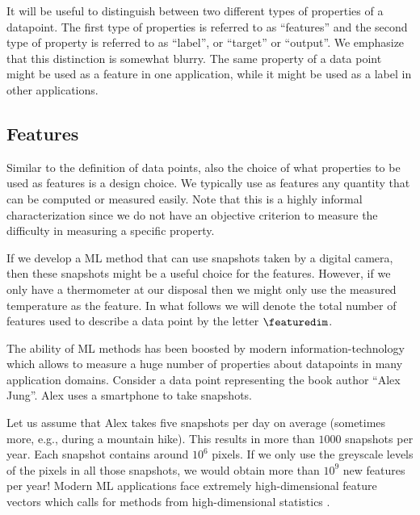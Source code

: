 \documentclass[12pt]{report}
\newcommand{\featurelen}{\featuredim}
\begin{document}
It will be useful to distinguish between two different types of properties of a 
datapoint. The first type of properties is referred to as ``features''  and the second 
type of property is referred to as ``label'', or ``target'' or ``output''. 
We emphasize that this distinction is somewhat blurry. The same 
property of a data point might be used as a feature in one application, 
while it might be used as a label in other applications. 

\subsection{Features}
\label{sec_feature_space}

Similar to the definition of data points, also the choice of what properties 
to be used as features is a design choice. We typically use as features any 
quantity that can be computed or measured easily. Note that this is a highly 
informal characterization since we do not have an objective criterion 
to measure the difficulty in measuring a specific property. 

If we develop a ML method that can use snapshots taken by a digital camera, then 
these snapshots might be a useful choice for the features. However, if we only have 
a thermometer at our disposal then we might only use the measured temperature as 
the feature. In what follows we will denote the total number of features used to describe 
a data point by the letter $\featurelen$. 

The ability of ML methods has been boosted by modern information-technology 
which allows to measure a huge number of properties about datapoints 
in many application domains. Consider a data point representing the book 
author ``Alex Jung''. Alex uses a smartphone to take snapshots. 

Let us assume that Alex takes five snapshots per day on average (sometimes 
more, e.g., during a mountain hike). This results in more than $1000$ 
snapshots per year. Each snapshot contains around $10^{6}$ pixels. 
If we only use the greyscale levels of the pixels in all those snapshots, 
we would obtain more than $10^{9}$ new features per year! Modern ML 
applications face extremely high-dimensional feature vectors which calls 
for methods from high-dimensional statistics \cite{BuhlGeerBook,Wain2019}. 
\end{document}
